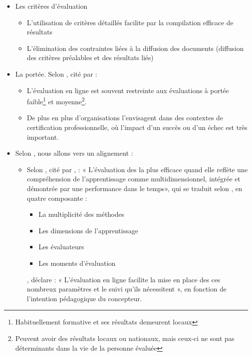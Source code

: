 \documentclass[aspectratio=169]{beamer}
\begin{document}
\begin{frame}[allowframebreaks]
\begin {itemize}
\begin {itemize}
\begin {itemize}
									\item La négociation
									\item La conservation des traces
								\end{itemize}
						\end{itemize}
					\framebreak
					\item Les critères d'évaluation
						\begin {itemize}		
							\item L'utilisation de critères détaillés facilite par la compilation efficace de résultats
							\item L'élimination des contraintes liées à la diffusion des documents (diffusion des critères préalables et des résultats liés)
						\end{itemize}
					\item La portée. Selon \citet{jisc2007a}, cité par  \citet{audet2011a} :
						\begin {itemize}		
							\item  L'évaluation en ligne est souvent restreinte aux évaluations à portée faible\footnote{Habituellement formative et ses résultats demeurent locaux} et moyenne\footnote{Peuvent avoir des résultats locaux ou nationaux, mais ceux-ci ne sont pas déterminants dans la vie de la personne évaluée}.
							\item De plus en plus d'organisations l'envisagent dans des contextes de certification professionnelle, où l'impact d'un succès ou d'un échec est très important.
						\end{itemize}
					\item Selon \citet{audet2011a}, nous allons vers un alignement :
						\begin {itemize}		
							\item Selon \citet{astin1992a}, cité par \citet{audet2011a}, : « L'évaluation des la plus efficace quand elle reflète une compréhension de l'apprentissage comme multidimensionnel, intégrée et démontrée par une performance dans le temps», qui se traduit selon \citet{angelo1996a}, en quatre composante :
								\begin {itemize}
									\item La multiplicité des méthodes
									\item Les dimensions de l'apprentissage
									\item Les évaluateurs
									\item Les moments d'évaluation
								\end{itemize}
								\citet{audet2011a}, déclare : « L'évaluation en ligne facilite la mise en place des ces nombreux paramètres et le suivi qu'ils nécessitent », en fonction de l'intention pédagogique du concepteur.
						\end{itemize}
				\end{itemize}
			\end{frame}
			
\end{document}
